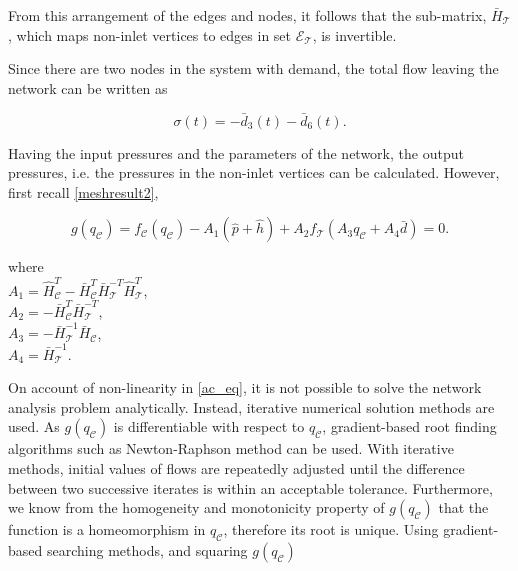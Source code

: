 From this arrangement of the edges and nodes, it follows that the sub-matrix, $\bar{H}_{\mathcal{T}}$, which maps non-inlet vertices to edges in set $\mathcal{E}_{\mathcal{T}}$, is invertible. 

Since there are two nodes in the system with demand, the total flow leaving the network can be written as

\begin{equation}
  \label{consumption1}
  \sigma(t) = -\bar{d}_3(t) - \bar{d}_6(t).
\end{equation}

Having the input pressures and the parameters of the network, the output pressures, i.e. the pressures in the non-inlet vertices can be calculated. However, first recall \eqref{meshresult2}, 

\begin{equation}
  \label{ac_eq} 
  g(q_{\mathcal{C}}) = f_{\mathcal{C}}(q_\mathcal{C}) - A_1(\hat{p} + \hat{h}) + A_2 f_{\mathcal{T}}(A_3 q_\mathcal{C} + A_4 \bar{d}) = 0.
\end{equation}

\begin{minipage}[t]{0.4\textwidth}
where\\
\hspace*{8mm} $A_1 = \hat{H}^T_{\mathcal{C}} -\bar{H}^T_{\mathcal{C}}\bar{H}^{-T}_{\mathcal{T}}\hat{H}^T_{\mathcal{T}}$, \vspace*{1.5mm}  \\
\hspace*{8mm} $A_2 = -\bar{H}^T_{\mathcal{C}}\bar{H}^{-T}_{\mathcal{T}}$, \vspace*{1.5mm}  \\
\hspace*{8mm} $A_3 = -\bar{H}^{-1}_{\mathcal{T}} \bar{H}_{\mathcal{C}} $, \vspace*{1.5mm}\\
\hspace*{8mm} $A_4 = \bar{H}^{-1}_{\mathcal{T}}$. 
\end{minipage}

On account of non-linearity in \eqref{ac_eq},  it is not possible to solve the network analysis problem analytically. Instead, iterative numerical solution methods are used. As $g(q_{\mathcal{C}})$ is differentiable with respect to $q_{\mathcal{C}}$, gradient-based root finding algorithms such as Newton-Raphson method can be used. With iterative methods, initial values of flows are repeatedly adjusted until the difference between two successive iterates is within an acceptable tolerance.  Furthermore, we know from the homogeneity and monotonicity property of $g(q_{\mathcal{C}})$ that the function is a homeomorphism in $q_{\mathcal{C}}$, therefore its root is unique. Using gradient-based searching methods, and squaring $g(q_{\mathcal{C}})$ 

